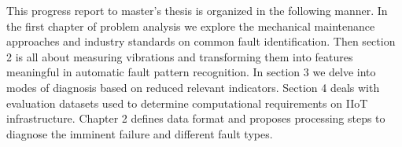 This progress report to master's thesis is organized in the following manner. In the first chapter of problem analysis we explore the mechanical maintenance approaches and industry standards on common fault identification. Then section 2 is all about measuring vibrations and transforming them into features meaningful in automatic fault pattern recognition. In section 3 we delve into modes of diagnosis based on reduced relevant indicators. Section 4 deals with evaluation datasets used to determine computational requirements on IIoT infrastructure. Chapter 2 defines data format and proposes processing steps to diagnose the imminent failure and different fault types.